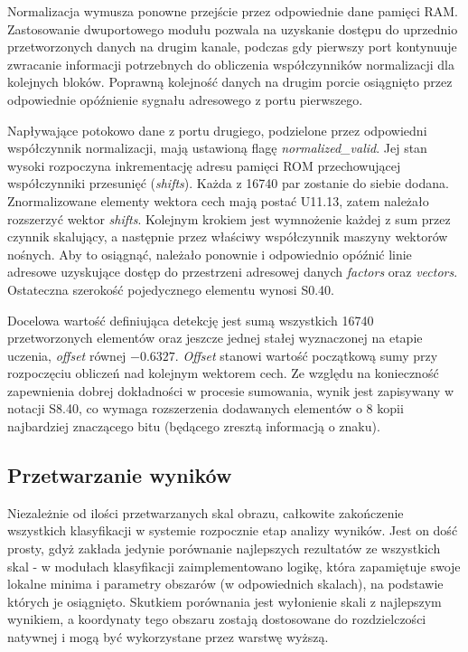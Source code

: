 Normalizacja wymusza ponowne przejście przez odpowiednie dane pamięci RAM. Zastosowanie dwuportowego modułu pozwala na uzyskanie dostępu do uprzednio przetworzonych danych na drugim kanale, podczas gdy pierwszy port kontynuuje zwracanie informacji potrzebnych do obliczenia współczynników normalizacji dla kolejnych bloków. Poprawną kolejność danych na drugim porcie osiągnięto przez odpowiednie opóźnienie sygnału adresowego z portu pierwszego. 

Napływające potokowo dane z portu drugiego, podzielone przez odpowiedni współczynnik normalizacji, mają ustawioną flagę \textit{normalized\_valid}. Jej stan wysoki rozpoczyna  inkrementację adresu pamięci ROM przechowującej współczynniki przesunięć (\textit{shifts}). Każda z 16740 par zostanie do siebie dodana. Znormalizowane elementy wektora cech mają postać U11.13, zatem należało rozszerzyć wektor \textit{shifts}. 
\newline
Kolejnym krokiem jest wymnożenie każdej z sum przez czynnik skalujący, a następnie przez właściwy współczynnik maszyny wektorów nośnych. Aby to osiągnąć, należało ponownie i odpowiednio opóźnić linie adresowe uzyskujące dostęp do przestrzeni adresowej danych \textit{factors} oraz \textit{vectors}. Ostateczna szerokość pojedycznego elementu wynosi S0.40.

Docelowa wartość definiująca detekcję jest sumą wszystkich 16740 przetworzonych  elementów oraz jeszcze jednej stałej wyznaczonej na etapie uczenia, \textit{offset} równej $-0.6327$. \textit{Offset} stanowi wartość początkową sumy przy rozpoczęciu obliczeń nad kolejnym wektorem cech.
Ze względu na konieczność zapewnienia dobrej dokładności w procesie sumowania, wynik jest zapisywany w notacji S8.40, co wymaga rozszerzenia dodawanych elementów o 8 kopii najbardziej znaczącego bitu (będącego zresztą informacją o znaku).

\subsection{Przetwarzanie wyników}

Niezależnie od ilości przetwarzanych skal obrazu, całkowite zakończenie wszystkich klasyfikacji w systemie rozpocznie etap analizy wyników. Jest on dość prosty, gdyż zakłada jedynie porównanie najlepszych rezultatów ze wszystkich skal - w modułach klasyfikacji zaimplementowano logikę, która zapamiętuje swoje lokalne minima i parametry obszarów (w odpowiednich skalach), na podstawie których je osiągnięto. Skutkiem porównania jest wyłonienie skali z najlepszym wynikiem, a koordynaty tego obszaru zostają dostosowane do rozdzielczości natywnej i mogą być wykorzystane przez warstwę wyższą.



 